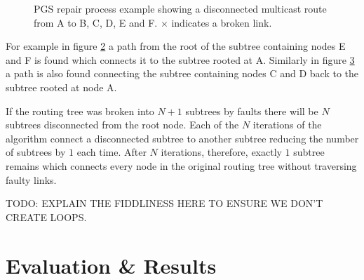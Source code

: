 		\begin{figure}
			\center
			\begin{subfigure}{0.32\linewidth}
				\hspace*{-1.5em}
				
				\caption{}
				\label{fig:pgs-repair-colouring}
			\end{subfigure}
			\begin{subfigure}{0.32\linewidth}
				\hspace*{-1.5em}
				
				\caption{}
				\label{fig:pgs-repair-colouring-fix1}
			\end{subfigure}
			\begin{subfigure}{0.32\linewidth}
				\hspace*{-1.5em}
				
				\caption{}
				\label{fig:pgs-repair-colouring-fix2}
			\end{subfigure}
			
			\caption{PGS repair process example showing a disconnected multicast
			route from A to B, C, D, E and F. $\times$ indicates a broken link.}
			\label{fig:pgs-repair-colouring-steps}
		\end{figure}
		
		For example in figure \ref{fig:pgs-repair-colouring-fix1} a path from the
		root of the subtree containing nodes E and F is found which connects it to
		the subtree rooted at A. Similarly in figure
		\ref{fig:pgs-repair-colouring-fix2} a path is also found connecting the
		subtree containing nodes C and D back to the subtree rooted at node A.
		
		If the routing tree was broken into $N+1$ subtrees by faults there will be
		$N$ subtrees disconnected from the root node. Each of the $N$ iterations of
		the algorithm connect a disconnected subtree to another subtree reducing
		the number of subtrees by $1$ each time. After $N$ iterations, therefore,
		exactly $1$ subtree remains which connects every node in the original
		routing tree without traversing faulty links.
		
		TODO: EXPLAIN THE FIDDLINESS HERE TO ENSURE WE DON'T CREATE LOOPS.
		
	\section{Evaluation \& Results}
		
